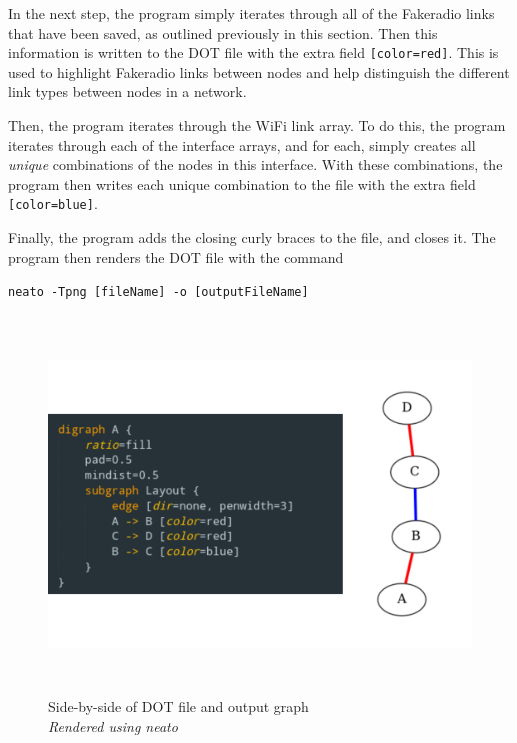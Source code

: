 In the next step, the program simply iterates through all of the Fakeradio links that have been saved, as outlined previously in this section.
Then this information is written to the DOT file with the extra field \verb|[color=red]|.
This is used to highlight Fakeradio links between nodes and help distinguish the different link types between nodes in a network.

Then, the program iterates through the WiFi link array. 
To do this, the program iterates through each of the interface arrays, and for each, simply creates all \emph{unique} combinations of the nodes in this interface.
With these combinations, the program then writes each unique combination to the file with the extra field \verb|[color=blue]|.

Finally, the program adds the closing curly braces to the file, and closes it.
The program then renders the DOT file with the command 

\verb|neato -Tpng [fileName] -o [outputFileName]|


\begin{figure}
    \begin{centering}
        \includegraphics[width=15cm,height=10cm,keepaspectratio]{Figures/Chapter5-DotAndRender.png}
        \caption{Side-by-side of DOT file and output graph\\\emph{Rendered using neato}}
        \label{fig:chapter5DotAndRender}
    \end{centering}
\end{figure}


